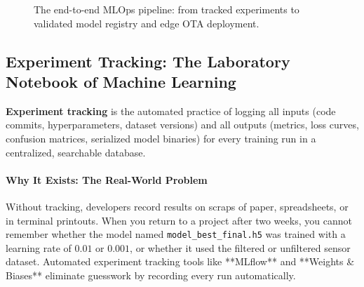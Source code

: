 \begin{figure}[htbp]
\centering
{}
\caption{The end-to-end MLOps pipeline: from tracked experiments to validated model registry and edge OTA deployment.}\label{fig:mlops_lifecycle}
\end{figure}

\subsection{Experiment Tracking: The Laboratory Notebook of Machine Learning}

\begin{keyidea}
\textbf{Experiment tracking} is the automated practice of logging all inputs (code commits, hyperparameters, dataset versions) and all outputs (metrics, loss curves, confusion matrices, serialized model binaries) for every training run in a centralized, searchable database.
\end{keyidea}

\paragraph{Why It Exists: The Real-World Problem}
Without tracking, developers record results on scraps of paper, spreadsheets, or in terminal printouts. When you return to a project after two weeks, you cannot remember whether the model named \texttt{model\_best\_final.h5} was trained with a learning rate of $0.01$ or $0.001$, or whether it used the filtered or unfiltered sensor dataset. Automated experiment tracking tools like **MLflow** and **Weights \& Biases** eliminate guesswork by recording every run automatically.

